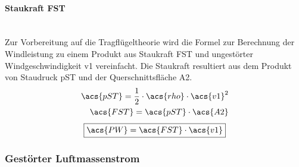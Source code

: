 \paragraph{Staukraft \acs{FST}}\mbox{}\smallskip\\
Zur Vorbereitung auf die Tragflügeltheorie wird die Formel zur Berechnung der Windleistung zu einem Produkt aus Staukraft \acs{FST} und ungestörter Windgeschwindigkeit \acs{v1} vereinfacht. Die Staukraft resultiert aus dem Produkt von Staudruck \acs{pST} und der Querschnittsfläche \acs{A2}.
\begin{align*}
    \acs{pST} = \frac{1}{2} \cdot \acs{rho} \cdot \acs{v1}^2 \\
    \acs{FST} = \acs{pST} \cdot \acs{A2}
\end{align*}
\begin{equation} \label{eq:Gleichung2.7}
    \boxed{\acs{PW} = \acs{FST} \cdot \acs{v1}}
\end{equation}

\subsubsection{Gestörter Luftmassenstrom}

